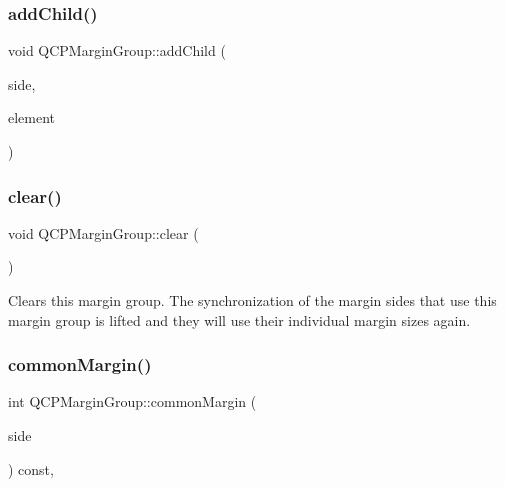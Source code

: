 \subsubsection{\texorpdfstring{addChild()}{addChild()}}
{\footnotesize\ttfamily void Q\+C\+P\+Margin\+Group\+::add\+Child (\begin{DoxyParamCaption}\item[{\mbox{\hyperlink{namespace_q_c_p_a7e487e3e2ccb62ab7771065bab7cae54}{Q\+C\+P\+::\+Margin\+Side}}}]{side,  }\item[{\mbox{\hyperlink{class_q_c_p_layout_element}{Q\+C\+P\+Layout\+Element}} $\ast$}]{element }\end{DoxyParamCaption})\hspace{0.3cm}{\ttfamily [protected]}}

\mbox{\label{class_q_c_p_margin_group_a144b67f216e4e86c3a3a309e850285fe}} 
\subsubsection{\texorpdfstring{clear()}{clear()}}
{\footnotesize\ttfamily void Q\+C\+P\+Margin\+Group\+::clear (\begin{DoxyParamCaption}{ }\end{DoxyParamCaption})}

Clears this margin group. The synchronization of the margin sides that use this margin group is lifted and they will use their individual margin sizes again. \mbox{\label{class_q_c_p_margin_group_aea6a00373b3a0305de56c34d2423ea99}} 
\subsubsection{\texorpdfstring{commonMargin()}{commonMargin()}}
{\footnotesize\ttfamily int Q\+C\+P\+Margin\+Group\+::common\+Margin (\begin{DoxyParamCaption}\item[{\mbox{\hyperlink{namespace_q_c_p_a7e487e3e2ccb62ab7771065bab7cae54}{Q\+C\+P\+::\+Margin\+Side}}}]{side }\end{DoxyParamCaption}) const\hspace{0.3cm}{\ttfamily [protected]}, {\ttfamily [virtual]}}

